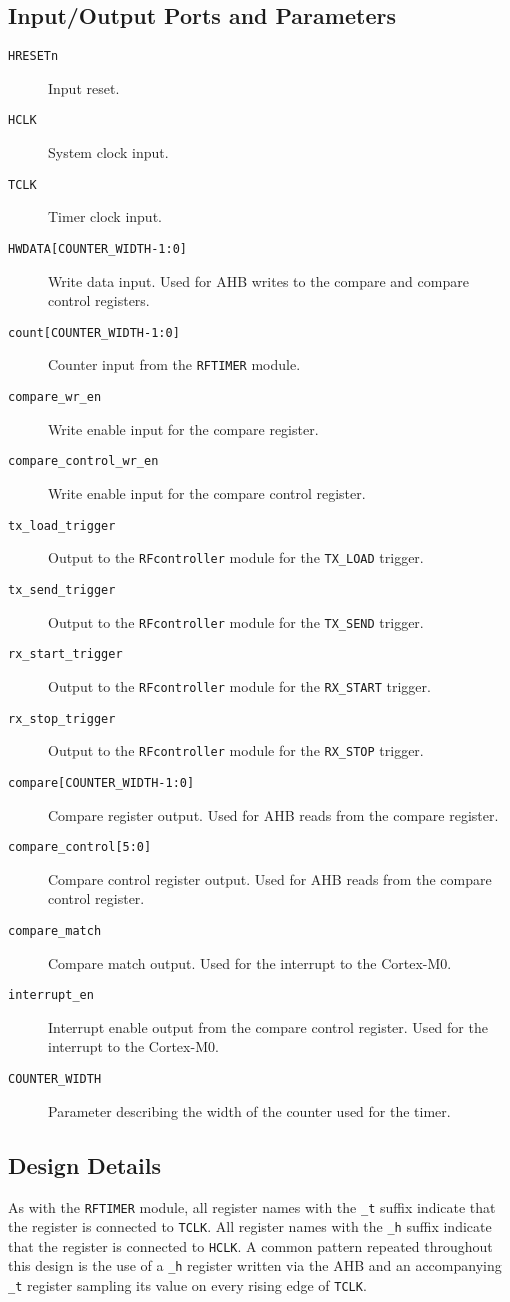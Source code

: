 \subsection{Input/Output Ports and Parameters}
\begin{description}
	\item[\texttt{HRESETn}] Input reset.
	\item[\texttt{HCLK}] System clock input.
	\item[\texttt{TCLK}] Timer clock input.
	\item[\texttt{HWDATA[COUNTER\_WIDTH-1:0]}] Write data input. Used for AHB writes to the compare and compare control registers.
	\item[\texttt{count[COUNTER\_WIDTH-1:0]}] Counter input from the \texttt{RFTIMER} module.
	\item[\texttt{compare\_wr\_en}] Write enable input for the compare register.
	\item[\texttt{compare\_control\_wr\_en}] Write enable input for the compare control register.
	\item[\texttt{tx\_load\_trigger}] Output to the \texttt{RFcontroller} module for the \texttt{TX\_LOAD} trigger.
	\item[\texttt{tx\_send\_trigger}] Output to the \texttt{RFcontroller} module for the \texttt{TX\_SEND} trigger.
	\item[\texttt{rx\_start\_trigger}] Output to the \texttt{RFcontroller} module for the \texttt{RX\_START} trigger.
	\item[\texttt{rx\_stop\_trigger}] Output to the \texttt{RFcontroller} module for the \texttt{RX\_STOP} trigger.
	\item[\texttt{compare[COUNTER\_WIDTH-1:0]}] Compare register output. Used for AHB reads from the compare register.
	\item[\texttt{compare\_control[5:0]}] Compare control register output. Used for AHB reads from the compare control register.
	\item[\texttt{compare\_match}] Compare match output. Used for the interrupt to the Cortex-M0.
	\item[\texttt{interrupt\_en}] Interrupt enable output from the compare control register. Used for the interrupt to the Cortex-M0.
	\item[\texttt{COUNTER\_WIDTH}] Parameter describing the width of the counter used for the timer.
\end{description}

\subsection{Design Details}
As with the \texttt{RFTIMER} module, all register names with the \texttt{\_t} suffix indicate that the register is connected to \texttt{TCLK}. All register names with the \texttt{\_h} suffix indicate that the register is connected to \texttt{HCLK}. A common pattern repeated throughout this design is the use of a \texttt{\_h} register written via the AHB and an accompanying \texttt{\_t} register sampling its value on every rising edge of \texttt{TCLK}.

